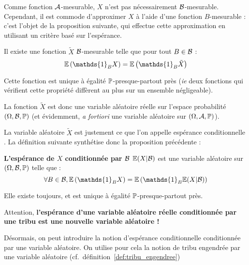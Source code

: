 \documentclass[../integ-proba.tex]{subfiles}
\begin{document}
    Comme fonction $\mathcal{A}$-mesurable, $X$ n'est pas nécessairement $\mathcal{B}$-mesurable.
    Cependant, il est commode \og d'approximer \fg{} $X$ à l'aide d'une fonction $B$-mesurable : c'est l'objet de la proposition suivante, qui effectue cette \og approximation \fg{} en utilisant un critère basé sur l'espérance.

    \begin{prop}
        Il existe une fonction $\tilde{X}$ $\mathcal{B}$-mesurable telle que pour tout $B \in \mathcal{B}$ :
        \begin{displaymath}
            \esp\left( \mathds{1}_B X \right) = \esp\left( \mathds{1}_B \tilde{X} \right)
        \end{displaymath}

        Cette fonction est unique à égalité $\mathbb{P}$-presque-partout près (\textit{ie} deux fonctions qui vérifient cette propriété diffèrent au plus sur un ensemble négligeable).
    \end{prop}

    \begin{rem}
        La fonction $\tilde{X}$ est donc une variable aléatoire réelle sur l'espace probabilité $\left( \Omega, \mathcal{B}, \mathbb{P} \right)$ (et évidemment, \textit{a fortiori} une variable aléatoire sur $\left( \Omega, \mathcal{A}, \mathbb{P} \right)$).
    \end{rem}

    La variable aléatoire $\tilde{X}$ est justement ce que l'on appelle \og espérance conditionnelle \fg.
    La définition suivante synthétise donc la proposition précédente :

    \begin{defi}
        \textbf{L'espérance de $X$ conditionnée par $\mathcal{B}$ $\mathbb{E}(X | \mathcal{B})$} est une variable aléatoire sur $\left( \Omega, \mathcal{B}, \mathbb{P} \right)$ telle que :
        \begin{displaymath}
            \forall B \in \B, \esp\left( \mathds{1}_B X \right) = \esp\left( \mathds{1}_B \esp(X | \B) \right)
        \end{displaymath}

        Elle existe toujours, et est unique à égalité $\mathbb{P}$-presque-partout près.
    \end{defi}

    \begin{rem}
        Attention, \textbf{l'espérance d'une variable aléatoire réelle conditionnée par une tribu est une nouvelle variable aléatoire !}
    \end{rem}

    Désormais, on peut introduire la notion d'espérance conditionnelle conditionnée par une variable aléatoire.
    On utilise pour cela la notion de tribu engendrée par une variable aléatoire (cf.\ définition~\ref{def:tribu_engendree})
\end{document}
